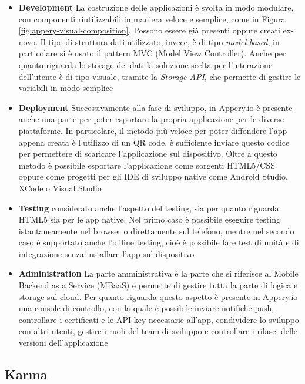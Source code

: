\begin{itemize}
	\item \textbf{Development}
	La costruzione delle applicazioni è svolta in modo modulare, con componenti riutilizzabili in maniera veloce e semplice, come in Figura \ref{fig:appery-visual-composition}. Possono essere già presenti oppure creati ex-novo. Il tipo di struttura dati utilizzato, invece, è di tipo \emph{model-based}, in particolare si è usato il pattern MVC (Model View Controller). Anche per quanto riguarda lo storage dei dati la soluzione scelta per l'interazione dell'utente è di tipo visuale, tramite la \emph{Storage API}, che permette di gestire le variabili in modo semplice
	\item \textbf{Deployment} Successivamente alla fase di sviluppo, in Appery.io è presente anche una parte per poter esportare la propria applicazione per le diverse piattaforme. In particolare, il metodo più veloce per poter diffondere l'app appena creata è l'utilizzo di un QR code. \upe è sufficiente inviare questo codice per permettere di scaricare l'applicazione sul dispositivo. Oltre a questo metodo è possibile esportare l'applicazione come sorgenti HTML5/CSS oppure come progetti per gli IDE di sviluppo native come Android Studio, XCode o Visual Studio
	\item \textbf{Testing} \upe considerato anche l'aspetto del testing, sia per quanto riguarda HTML5 sia per  le app native.
	Nel primo caso è possibile eseguire testing istantaneamente nel browser o direttamente sul telefono, mentre nel secondo caso è supportato anche l'offline testing, cioè è possibile fare test di unità e di integrazione senza installare l'app sul dispositivo
	\item \textbf{Administration} La parte amministrativa è la parte che si riferisce al Mobile Backend as a Service (MBaaS) e permette di gestire tutta la parte di logica e storage sul cloud. Per quanto riguarda questo aspetto è presente in Appery.io una console di controllo, con la quale è possibile inviare notifiche push, controllare i certificati e le API key necessarie all'app, condividere lo sviluppo con altri utenti, gestire i ruoli del team di sviluppo e controllare i rilasci delle versioni dell'applicazione
\end{itemize}

\subsection*{Karma}

